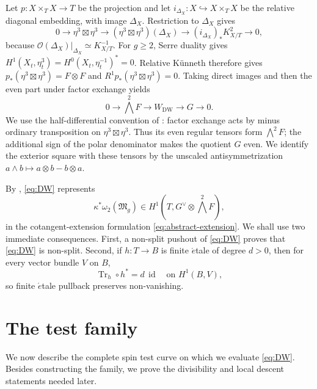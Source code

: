 \documentclass[11pt,a4paper,dvipsnames]{amsart}
\numberwithin{equation}{section}
\theoremstyle{plain}
\theoremstyle{definition}
\newcommand{\cO}{\mathcal O}
\newcommand{\M}{\mathfrak M}
\newcommand{\id}{\operatorname{id}}
\begin{document}
Let $p:X\times_T X\to T$ be the projection and let
$i_{\Delta_X}:X\hookrightarrow X\times_T X$ be the relative diagonal
embedding, with image $\Delta_X$.  Restriction to $\Delta_X$ gives
\begin{equation}\label{eq:diagonal-sequence}
0\longrightarrow \eta^3\boxtimes\eta^3
\longrightarrow (\eta^3\boxtimes\eta^3)(\Delta_X)
\longrightarrow (i_{\Delta_X})_*K_{X/T}^2\longrightarrow0,
\end{equation}
because $\cO(\Delta_X)|_{\Delta_X}\simeq K_{X/T}^{-1}$.
For $g\geq2$, Serre duality gives
$H^1(X_t,\eta_t^3)=H^0(X_t,\eta_t^{-1})^*=0$.
Relative K\"unneth therefore gives $p_*(\eta^3\boxtimes\eta^3)=F\otimes F$
and $R^1p_*(\eta^3\boxtimes\eta^3)=0$.
Taking direct images and then the even part under factor exchange yields
\begin{equation}\label{eq:DW}
0\longrightarrow\bigwedge^2F
\longrightarrow W_{\mathrm{DW}}
\longrightarrow G\longrightarrow0.
\end{equation}
We use the half-differential convention of
\cite[\S3.1, equation~(3.6)]{DonagiWittenAtiyah}: factor exchange acts by
minus ordinary transposition on $\eta^3\boxtimes\eta^3$.  Thus its even
regular tensors form $\bigwedge^2F$; the additional sign of the polar
denominator makes the quotient $G$ even.  We identify the exterior square
with these tensors by the unscaled antisymmetrization
$a\wedge b\mapsto a\otimes b-b\otimes a$.

By \cite[Proposition~3.1 and Theorem~3.2]{DonagiWittenAtiyah},
\eqref{eq:DW} represents
$$
 \kappa^*\omega_2(\M_g)
 \in H^1\!\left(T,G^\vee\otimes\bigwedge^2F\right),
$$
in the cotangent-extension formulation \eqref{eq:abstract-extension}.  We shall use two immediate consequences.  First, a
non-split pushout of \eqref{eq:DW} proves that \eqref{eq:DW} is non-split.
Second, if $h:T\to B$ is finite $\acute{e}$tale of degree $d>0$, then for
every vector bundle $V$ on $B$,
\begin{equation}\label{eq:trace-injective}
 \operatorname{Tr}_h\circ h^*=d\,\id
 \quad\text{on }H^1(B,V),
\end{equation}
so finite $\acute{e}$tale pullback preserves non-vanishing.

\section{The test family} \label{BD}

We now describe the complete spin test curve on which we evaluate
\eqref{eq:DW}.  Besides constructing the family, we prove the divisibility
and local descent statements needed later.
\end{document}
